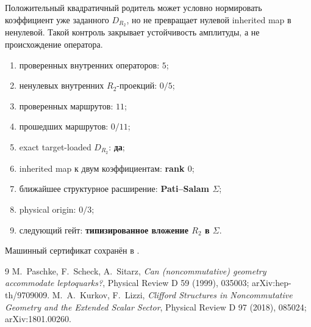 \begin{nogocriterion}
Положительный квадратичный родитель может условно нормировать коэффициент
уже заданного $D_{R_2}$, но не превращает нулевой inherited map в
ненулевой. Такой контроль закрывает устойчивость амплитуды, а не
происхождение оператора.
\end{nogocriterion}

\begin{protocol}\begin{enumerate}
\item проверенных внутренних операторов: \textbf{$5$};
\item ненулевых внутренних $R_2$-проекций: \textbf{$0/5$};
\item проверенных маршрутов: \textbf{$11$};
\item прошедших маршрутов: \textbf{$0/11$};
\item exact target-loaded $D_{R_2}$: \textbf{да};
\item inherited map к двум коэффициентам: \textbf{rank $0$};
\item ближайшее структурное расширение: \textbf{Pati--Salam $\Sigma$};
\item physical origin: \textbf{$0/3$};
\item следующий гейт: \textbf{типизированное вложение $R_2$ в $\Sigma$}.
\end{enumerate}\end{protocol}

Машинный сертификат сохранён в
.

\begin{thebibliography}{9}
M.~Paschke, F.~Scheck, A.~Sitarz,
\emph{Can (noncommutative) geometry accommodate leptoquarks?},
Physical Review D 59 (1999), 035003; arXiv:hep-th/9709009.
M.~A.~Kurkov, F.~Lizzi,
\emph{Clifford Structures in Noncommutative Geometry and the Extended Scalar Sector},
Physical Review D 97 (2018), 085024; arXiv:1801.00260.
\end{thebibliography}